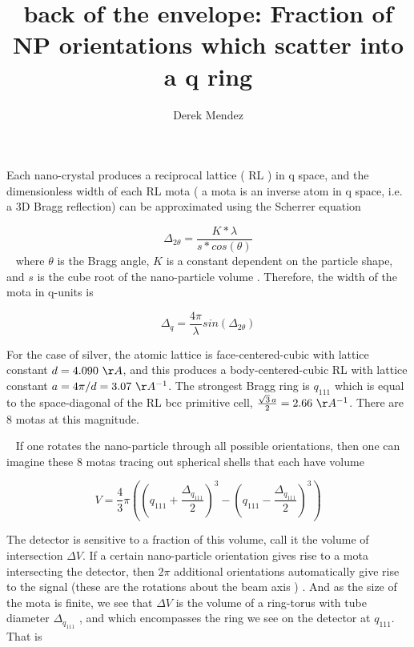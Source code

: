 \documentclass[fontsize=15pt, paper=a4]{amsart}
\title{back of the envelope: Fraction of NP orientations which scatter into a q ring}
\author{Derek Mendez}
\begin{document}
\maketitle

\noindent Each nano-crystal produces a reciprocal lattice ( RL ) in q space, and the dimensionless width of each RL mota ( a mota is an inverse atom in q space, i.e. a 3D Bragg reflection) can be approximated using the Scherrer equation

\begin{equation}
\Delta_{2\theta} =\frac{K * \lambda}{s * cos(\theta)}
\end{equation}
\ \newline 
\noindent where  $ \theta  $ is the Bragg angle, $K$ is a constant dependent on the particle shape, and $s$ is the cube root of the nano-particle volume . Therefore, the width of the mota in q-units is  

\begin{equation}
\Delta_{q}  = \frac{4\pi}{\lambda} sin(\Delta_{2\theta} ) 
\end{equation}

For the case of silver, the atomic lattice is face-centered-cubic with lattice constant $d= 4.090 \,\,\AA$, and this produces a body-centered-cubic RL with lattice constant $a= 4\pi / d =  3.07\,\, \AA^{-1}$. The strongest Bragg ring is $q_{111}$ which is equal to the space-diagonal of the RL bcc primitive cell, $\frac{\sqrt{3} \,a}{2} = 2.66 \,\,\AA^{-1} $. There are 8 motas at this magnitude. 

\ \newline
If one rotates the nano-particle through all possible orientations, then one can imagine these 8 motas tracing out spherical shells that each have volume

\begin{equation}
V = \frac{4}{3} \pi \left( \left ( q_{111} + \frac{\Delta_{q_{111}}}{2} \right )^{3} - \left (q_{111} - \frac{\Delta_{q_{111}}}{2} \right )^{3} \right)  
\end{equation}

The detector is sensitive to a fraction of this volume, call it the volume of intersection $\Delta V$. If a certain nano-particle orientation gives rise to a mota intersecting the detector, then $2\pi$ additional orientations automatically give rise to the signal (these are the rotations about the beam axis ) . And as the size of the mota is finite, we see that $\Delta V$ is the volume of a ring-torus with tube diameter $\Delta_{q_{111}}$ , and which encompasses the ring we see on the detector at $q_{111}$. That is
\end{document}
